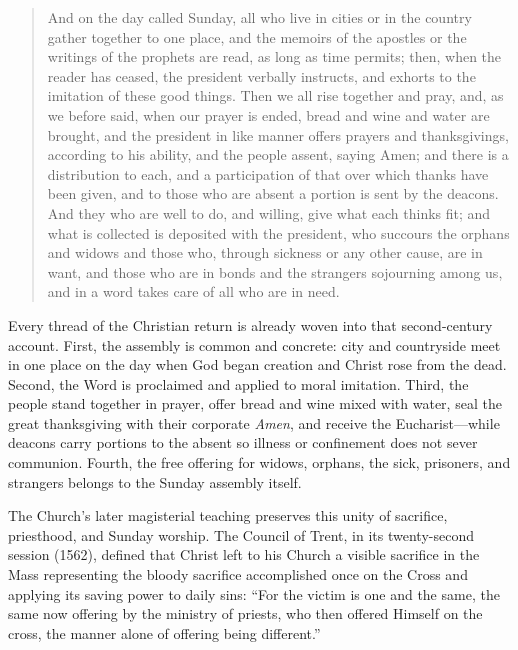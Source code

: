 \begin{quote}
And on the day called Sunday, all who live in cities or in the country gather together to one place, and the memoirs of the apostles or the writings of the prophets are read, as long as time permits; then, when the reader has ceased, the president verbally instructs, and exhorts to the imitation of these good things. Then we all rise together and pray, and, as we before said, when our prayer is ended, bread and wine and water are brought, and the president in like manner offers prayers and thanksgivings, according to his ability, and the people assent, saying Amen; and there is a distribution to each, and a participation of that over which thanks have been given, and to those who are absent a portion is sent by the deacons. And they who are well to do, and willing, give what each thinks fit; and what is collected is deposited with the president, who succours the orphans and widows and those who, through sickness or any other cause, are in want, and those who are in bonds and the strangers sojourning among us, and in a word takes care of all who are in need.
\end{quote}

Every thread of the Christian return is already woven into that second-century account. First, the assembly is common and concrete: city and countryside meet in one place on the day when God began creation and Christ rose from the dead. Second, the Word is proclaimed and applied to moral imitation. Third, the people stand together in prayer, offer bread and wine mixed with water, seal the great thanksgiving with their corporate \emph{Amen}, and receive the Eucharist---while deacons carry portions to the absent so illness or confinement does not sever communion. Fourth, the free offering for widows, orphans, the sick, prisoners, and strangers belongs to the Sunday assembly itself.

The Church's later magisterial teaching preserves this unity of sacrifice, priesthood, and Sunday worship. The Council of Trent, in its twenty-second session (1562), defined that Christ left to his Church a visible sacrifice in the Mass representing the bloody sacrifice accomplished once on the Cross and applying its saving power to daily sins: ``For the victim is one and the same, the same now offering by the ministry of priests, who then offered Himself on the cross, the manner alone of offering being different.''

